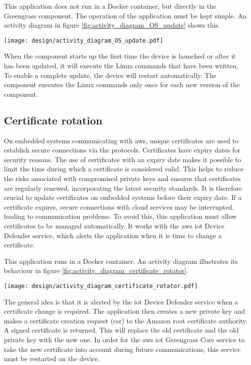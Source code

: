 This application does not run in a Docker container, but directly in the Greengrass component. The operation of the application must be kept simple. An activity diagram in figure \ref{fig:activity_diagram_OS_update} shows this.
\begin{center}
    \begingroup
    \texttt{[image: design/activity\_diagram\_OS\_update.pdf]}
    \label{fig:activity_diagram_OS_update}
    \endgroup
\end{center}
When the component starts up the first time the device is launched or after it has been updated, it will execute the Linux commands that have been written. To enable a complete update, the device will restart automatically. The component executes the Linux commands only once for each new version of the component.

\subsection{Certificate rotation}
On embedded systems communicating with \gls{aws}, unique certificates are used to establish secure connections via the protocols. Certificates have expiry dates for security reasons. The use of certificates with an expiry date makes it possible to limit the time during which a certificate is considered valid. This helps to reduce the risks associated with compromised private keys and ensures that certificates are regularly renewed, incorporating the latest security standards. It is therefore crucial to update certificates on embedded systems before their expiry date. If a certificate expires, secure connections with \gls{cloud} services may be interrupted, leading to communication problems. To avoid this, this application must allow certificates to be managed automatically. It works with the \gls{aws} \acrshort{iot} Device Defender service, which alerts the application when it is time to change a certificate.

This application runs in a Docker container. An activity diagram illustrates its behaviour in figure \ref{fig:activity_diagram_certificate_rotator}.
\begin{center}
    \begingroup
    \texttt{[image: design/activity\_diagram\_certificate\_rotator.pdf]}
    \label{fig:activity_diagram_certificate_rotator}
    \endgroup
\end{center}
The general idea is that it is alerted by the \acrshort{iot} Device Defender service when a certificate change is required. The application then creates a new private key and makes a certificate creation request (\acrfull{csr}) to the Amazon root certificate authority. A signed certificate is returned. This will replace the old certificate and the old private key with the new one. In order for the \gls{aws} \acrshort{iot} Greengrass Core service to take the new certificate into account during future communications, this service must be restarted on the device.

